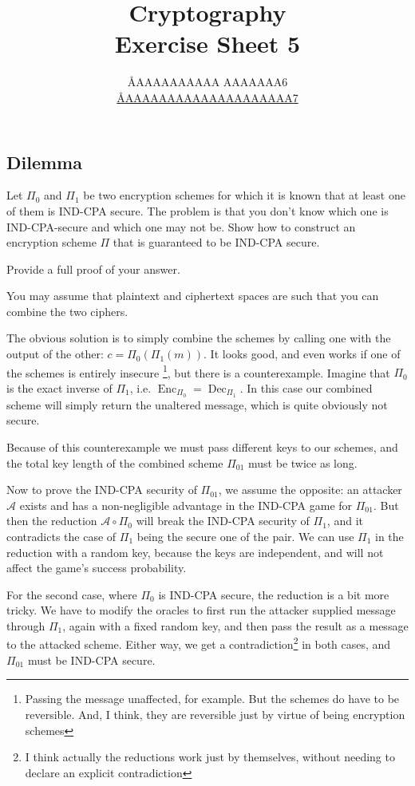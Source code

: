 \documentclass{article}
\title{Cryptography \\ Exercise Sheet 5}
\author{
  \AA{AAAAAAAAAA AAAAAAA}{6} \\
  \href{mailto:\AA{AAAAAAAAAAAAAAAAAAAA}{7}}{\AA{AAAAAAAAAAAAAAAAAAAA}{7}}
}
\begin{document}
  \maketitle

  \setcounter{section}{5}
  \subsection{Dilemma}
  \begin{centerframebox}
    Let $\Pi_0$ and $\Pi_1$ be two encryption schemes for which it is known that at
    least one of them is IND-CPA secure. The problem is that you don't know
    which one is IND-CPA-secure and which one may not be. Show how to
    construct an encryption scheme $\Pi$ that is guaranteed to be IND-CPA secure.

    Provide a full proof of your answer.

    You may assume that plaintext and ciphertext spaces are such that you can
    combine the two ciphers.
  \end{centerframebox}
  The obvious solution is to simply combine the schemes by calling one with the output of the other: $c = \Pi_0(\Pi_1(m))$.
  It looks good, and even works if one of the schemes is entirely insecure%
  \footnote{Passing the message unaffected, for example. But the schemes do have to be reversible. And, I think, they are reversible just by virtue of being encryption schemes},
  but there is a counterexample.
  Imagine that $\Pi_0$ is the exact inverse of $\Pi_1$, i.e. $\operatorname{Enc}_{\Pi_0} = \operatorname{Dec}_{\Pi_1}$.
  In this case our combined scheme will simply return the unaltered message, which is quite obviously not secure.

  Because of this counterexample we must pass different keys to our schemes,
  and the total key length of the combined scheme $\Pi_{01}$ must be twice as long.

  Now to prove the IND-CPA security of $\Pi_{01}$, we assume the opposite:
  an attacker $\mathcal{A}$ exists and has a non-negligible advantage in the IND-CPA game for $\Pi_{01}$.
  But then the reduction $\mathcal{A} \circ \Pi_0$ will break the IND-CPA security of $\Pi_1$,
  and it contradicts the case of $\Pi_1$ being the secure one of the pair.
  We can use $\Pi_1$ in the reduction with a random key, because the keys are independent,
  and will not affect the game's success probability.

  For the second case, where $\Pi_0$ is IND-CPA secure, the reduction is a bit more tricky.
  We have to modify the oracles to first run the attacker supplied message through $\Pi_1$,
  again with a fixed random key, and then pass the result as a message to the attacked scheme.
  Either way, we get a contradiction\footnote{I think actually the reductions work just by themselves, without needing to declare an explicit contradiction} in both cases, and $\Pi_{01}$ must be IND-CPA secure.
\end{document}
